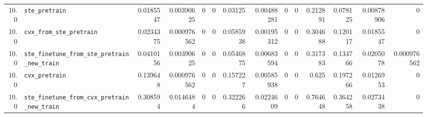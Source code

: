 \begin{longtable}{@{}r l *{12}{r}@{}}
10.0 & \texttt{ste\_pretrain} & 0.0185547 & 0.00390625 & 0 & 0 & 0.03125 & 0.00488281 & 0 & 0 & 0.212891 & 0.078125 & 0.00878906 & 0 \\
10.0 & \texttt{cvx\_from\_ste\_pretrain} & 0.0234375 & 0.000976562 & 0 & 0 & 0.0585938 & 0.00195312 & 0 & 0 & 0.304688 & 0.120117 & 0.0185547 & 0 \\
10.0 & \texttt{ste\_finetune\_from\_ste\_pretrain\_new\_train} & 0.0410156 & 0.00390625 & 0 & 0 & 0.0546875 & 0.00683594 & 0 & 0 & 0.317383 & 0.134766 & 0.0205078 & 0.000976562 \\
10.0 & \texttt{cvx\_pretrain} & 0.139648 & 0.000976562 & 0 & 0 & 0.157227 & 0.00585938 & 0 & 0 & 0.625 & 0.197266 & 0.0126953 & 0 \\
10.0 & \texttt{ste\_finetune\_from\_cvx\_pretrain\_new\_train} & 0.308594 & 0.0146484 & 0 & 0 & 0.322266 & 0.0224609 & 0 & 0 & 0.764648 & 0.364258 & 0.0273438 & 0 \\
\end{longtable}


